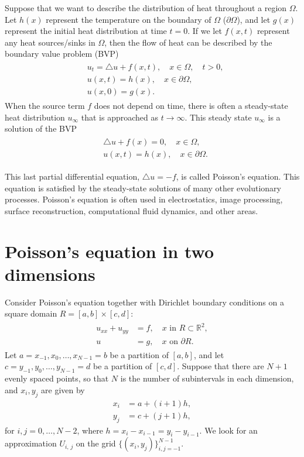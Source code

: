 \label{lab:poisson2d}

Suppose that we want to describe the distribution of heat throughout a region $\Omega$.
Let $h(x)$ represent the temperature on the boundary of $\Omega$ ($\partial \Omega$), and let $g(x)$ represent the initial heat distribution at time $t = 0$.
If we let $f(x,t)$ represent any heat sources/sinks in $\Omega$, then the flow of heat can be described by the boundary value problem (BVP)
\begin{align}
	\begin{split}
		& { } u_t = \triangle u + f(x,t), \quad x \in \Omega, \quad t >0,\\
		& { }u(x,t) = h(x), \quad x \in \partial \Omega, \\
		& { }u(x,0) = g(x).
	\end{split}
\end{align}
When the source term $f$ does not depend on time, there is often a steady-state heat distribution $u_{\infty}$ that is approached as $t \to \infty$.
This steady state $u_{\infty}$ is a solution of the BVP
\begin{align}
	\begin{split}
		& { }  \triangle u + f(x) = 0, \quad x \in \Omega,\\
		& { }u(x,t) = h(x), \quad x \in \partial \Omega.
	\end{split}
\end{align}

This last partial differential equation, $\triangle u = -f$, is called Poisson's equation.
This equation is satisfied by the steady-state solutions of many other evolutionary processes.
Poisson's equation is often used in electrostatics, image processing, surface reconstruction, computational fluid dynamics, and other areas.


\section*{Poisson's equation in two dimensions}

 Consider Poisson's equation together with Dirichlet boundary conditions on a square domain $R = [a,b]\times [c,d]$:
 \begin{align}
	\begin{split}
 	u_{xx} + u_{yy} &= f,\quad x \text{ in } R \subset \mathbb{R}^2,\\
 	u &= g, \quad x \text{ on } \partial R.
	\end{split}\label{eqn:2d_poisson}
\end{align}
Let $a = x_{-1}, x_0, \ldots, x_{N-1} = b$ be a partition of $[a,b]$, and let $c = y_{-1}, y_0, \ldots, y_{N-1} = d$ be a partition of $[c,d]$.
Suppose that there are $N+1$ evenly spaced points, so that $N$ is the number of subintervals in each dimension, and $x_i, y_j$ are given by
\begin{align*}
	x_i &= a + (i+1)h, \\
	y_j &= c + (j+1)h,
\end{align*}
for $i,j = 0, \ldots, N-2$, where $h = x_i-x_{i-1} = y_i-y_{i-1}$.
We look for an approximation $U_{i,\,j}$ on the grid $\{(x_i,y_j)\}_{i,j=-1}^{N-1}$.

